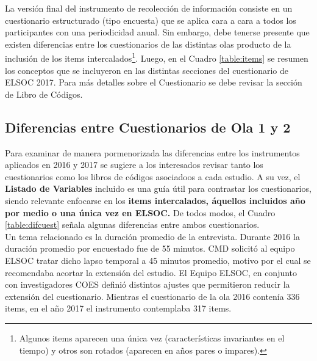 \documentclass[12pt]{report}
\begin{document}
La versión final del instrumento de recolección de información consiste en un cuestionario estructurado (tipo encuesta) que se aplica cara a cara a todos los participantes con una periodicidad anual. Sin embargo, debe tenerse presente que existen diferencias entre los cuestionarios de las distintas olas producto de la inclusión de los items intercalados\footnote{Algunos items aparecen una única vez (características invariantes en el tiempo) y otros son rotados (aparecen en años pares o impares).}. Luego, en el Cuadro \ref{table:items} se resumen los conceptos que se incluyeron en las distintas secciones del cuestionario de ELSOC 2017. Para más detalles sobre el Cuestionario se debe revisar la sección de Libro de Códigos.\\

\newpage
\subsection*{Diferencias entre Cuestionarios de Ola 1 y 2}

Para examinar de manera pormenorizada las diferencias entre los instrumentos aplicados en 2016 y 2017 se sugiere a los interesados revisar tanto los cuestionarios como los libros de códigos asociadoos a cada estudio. A su vez, el \textbf{Listado de Variables} incluido es una guía útil para contrastar los cuestionarios, siendo relevante enfocarse en los \textbf{items intercalados, áquellos incluidos año por medio o una única vez en ELSOC.} De todos modos, el Cuadro \ref{table:difcuest} señala algunas diferencias entre ambos cuestionarios. \\

Un tema relacionado es la duración promedio de la entrevista. Durante 2016 la duración promedio por encuestado fue de 55 minutos. CMD solicitó al equipo ELSOC tratar dicho lapso temporal a 45 minutos promedio, motivo por el cual se recomendaba acortar la extensión del estudio. El Equipo ELSOC, en conjunto con investigadores COES definió distintos ajustes que permitieron reducir la extensión del cuestionario. Mientras el cuestionario de la ola 2016 contenía 336 items, en el año 2017 el instrumento contemplaba 317 items. 
\end{document}
